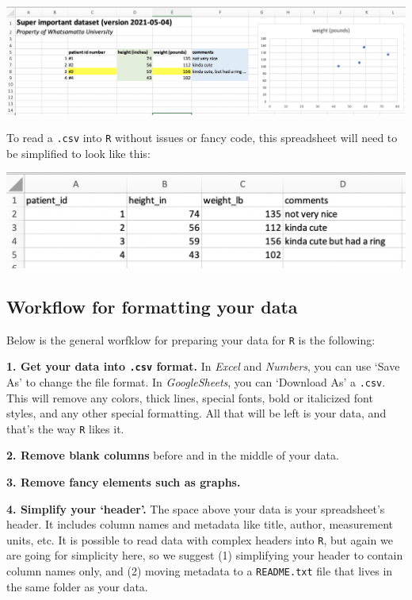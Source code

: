 \documentclass[
]{book}
\begin{document}
\includegraphics{img/csv_dont.png}

To read a \texttt{.csv} into \texttt{R} without issues or fancy code, this spreadsheet will need to be simplified to look like this:

\includegraphics{img/csv_do.png}

\hypertarget{workflow-for-formatting-your-data}{%
\subsection*{Workflow for formatting your data}\label{workflow-for-formatting-your-data}}

Below is the general worfklow for preparing your data for \texttt{R} is the following:

\textbf{1. Get your data into \texttt{.csv} format.} In \emph{Excel} and \emph{Numbers}, you can use `Save As' to change the file format. In \emph{GoogleSheets}, you can `Download As' a \texttt{.csv}. This will remove any colors, thick lines, special fonts, bold or italicized font styles, and any other special formatting. All that will be left is your data, and that's the way \texttt{R} likes it.

\textbf{2. Remove blank columns} before and in the middle of your data.

\textbf{3. Remove fancy elements such as graphs.}

\textbf{4. Simplify your `header'.} The space above your data is your spreadsheet's header. It includes column names and metadata like title, author, measurement units, etc. It is possible to read data with complex headers into \texttt{R}, but again we are going for simplicity here, so we suggest (1) simplifying your header to contain column names only, and (2) moving metadata to a \texttt{README.txt} file that lives in the same folder as your data.
\end{document}
